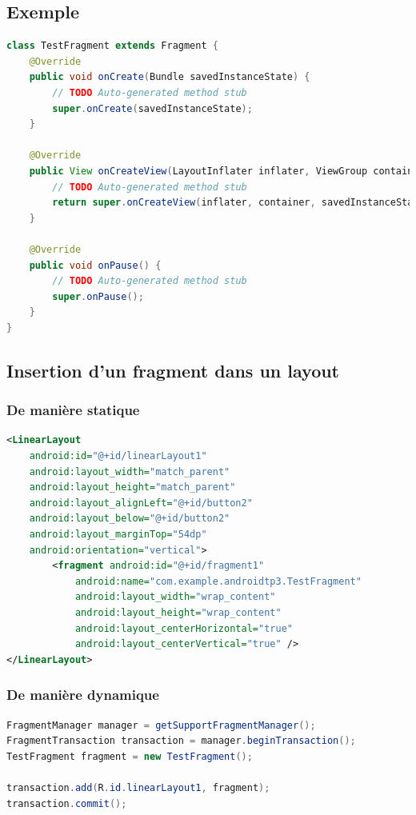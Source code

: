\subsection{Exemple}
\begin{lstlisting}[language=java]
class TestFragment extends Fragment {
    @Override
    public void onCreate(Bundle savedInstanceState) {
        // TODO Auto-generated method stub
        super.onCreate(savedInstanceState);
    }
    
    @Override
    public View onCreateView(LayoutInflater inflater, ViewGroup container, Bundle savedInstanceState) {
        // TODO Auto-generated method stub
        return super.onCreateView(inflater, container, savedInstanceState);
    }
    
    @Override
    public void onPause() {
        // TODO Auto-generated method stub
        super.onPause();
    }
}
\end{lstlisting}

\subsection{Insertion d'un fragment dans un layout}
\subsubsection{De manière statique}
\begin{lstlisting}[language=xml]
<LinearLayout
    android:id="@+id/linearLayout1"
    android:layout_width="match_parent"
    android:layout_height="match_parent"
    android:layout_alignLeft="@+id/button2"
    android:layout_below="@+id/button2"
    android:layout_marginTop="54dp"
    android:orientation="vertical">
        <fragment android:id="@+id/fragment1"
            android:name="com.example.androidtp3.TestFragment"
            android:layout_width="wrap_content"
            android:layout_height="wrap_content"
            android:layout_centerHorizontal="true"
            android:layout_centerVertical="true" />
</LinearLayout>
\end{lstlisting}

\subsubsection{De manière dynamique}
\begin{lstlisting}[language=java]
FragmentManager manager = getSupportFragmentManager();
FragmentTransaction transaction = manager.beginTransaction();
TestFragment fragment = new TestFragment();

transaction.add(R.id.linearLayout1, fragment);
transaction.commit();
\end{lstlisting}


